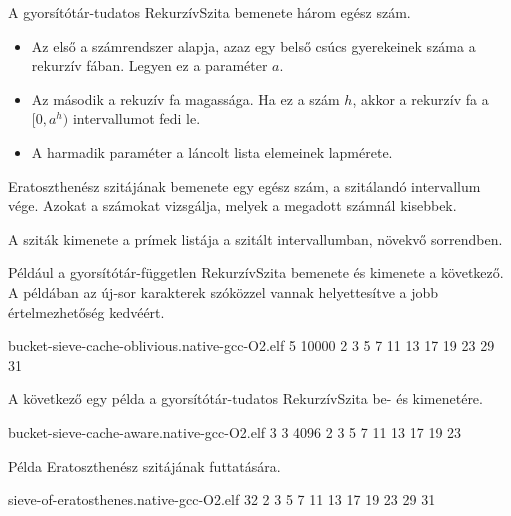 \documentclass[12pt]{report}
\begin{document}
A gyorsítótár-tudatos RekurzívSzita bemenete három egész szám.
\begin{itemize}
\item
Az első a számrendszer alapja, azaz egy belső csúcs gyerekeinek száma a rekurzív fában.
Legyen ez a paraméter $a$.
\item Az második a rekuzív fa magassága.
Ha ez a szám $h$,
akkor a rekurzív fa a $[0, a^h)$ intervallumot fedi le.
\item A harmadik paraméter a láncolt lista elemeinek lapmérete.
\end{itemize}

Eratoszthenész szitájának bemenete egy egész szám,
a szitálandó intervallum vége.
Azokat a számokat vizsgálja, melyek a megadott számnál kisebbek.

A sziták kimenete a prímek listája
a szitált intervallumban, növekvő sorrendben.

Például a gyorsítótár-független RekurzívSzita bemenete és kimenete a következő.
A példában az új-sor karakterek szóközzel vannak helyettesítve
a jobb értelmezhetőség kedvéért.
\begin{table}[ht]
\centering
\caption{A gyorsítótár-független RekurzívSzita futtatásának példája}
\label{table-bucket-sieve-oblivious-example-run}
\begin{boxedverbatim}
bucket-sieve-cache-oblivious.native-gcc-O2.elf
5 10000
2 3 5 7 11 13 17 19 23 29 31
\end{boxedverbatim}
\end{table}

A következő egy példa a gyorsítótár-tudatos RekurzívSzita be- és kimenetére.
\begin{table}[ht]
\centering
\caption{A gyorsítótár-tudatos RekurzívSzita futtatásának példája}
\label{table-bucket-sieve-aware-example-run}
\begin{boxedverbatim}
bucket-sieve-cache-aware.native-gcc-O2.elf 
3 3 4096
2 3 5 7 11 13 17 19 23
\end{boxedverbatim}
\end{table}

Példa Eratoszthenész szitájának futtatására.
\begin{table}[ht]
\centering
\caption{Az eratoszthenészi szita futtatásának példája}
\label{table-sieve-of-eratosthenes-run}
\begin{boxedverbatim}
sieve-of-eratosthenes.native-gcc-O2.elf 
32
2 3 5 7 11 13 17 19 23 29 31
\end{boxedverbatim}
\end{table}
\end{document}
